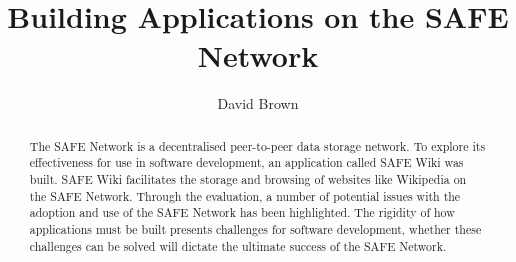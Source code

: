 \documentclass{l4proj}
\begin{document}
\title{Building Applications on the SAFE Network}
\author{David Brown}
\maketitle

\begin{abstract}

The SAFE Network is a decentralised peer-to-peer data storage network. To explore its effectiveness for use in software development, an application called SAFE Wiki was built. SAFE Wiki facilitates the storage and browsing of websites like Wikipedia on the SAFE Network. Through the evaluation, a number of potential issues with the adoption and use of the SAFE Network has been highlighted. The rigidity of how applications must be built presents challenges for software development, whether these challenges can be solved will dictate the ultimate success of the SAFE Network.

\end{abstract}

\educationalconsent

\tableofcontents








\printbibliography
\end{document}
